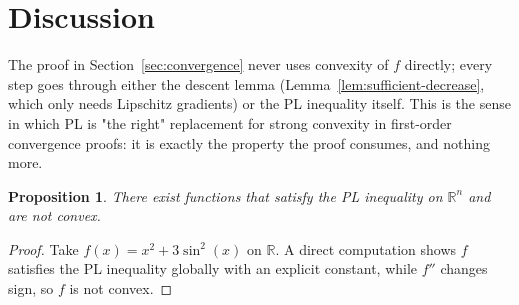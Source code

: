 \documentclass[11pt]{article}
\newtheorem{proposition}[theorem]{Proposition}
\theoremstyle{definition}
\theoremstyle{remark}
\begin{document}
\section{Discussion}
\label{sec:discussion}

The proof in Section~\ref{sec:convergence} never uses convexity of $f$
directly; every step goes through either the descent lemma
(Lemma~\ref{lem:sufficient-decrease}, which only needs Lipschitz
gradients) or the PL inequality itself. This is the sense in which PL
is "the right" replacement for strong convexity in first-order
convergence proofs: it is exactly the property the proof consumes, and
nothing more.

\begin{proposition}
\label{prop:pl-vs-convex}
There exist functions that satisfy the PL inequality on $\mathbb{R}^n$
and are not convex.
\end{proposition}

\begin{proof}
Take $f(x) = x^2 + 3\sin^2(x)$ on $\mathbb{R}$. A direct computation
shows $f$ satisfies the PL inequality globally with an explicit
constant, while $f'' $ changes sign, so $f$ is not convex.
\end{proof}
\end{document}
